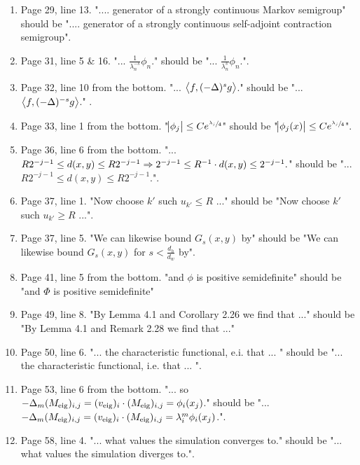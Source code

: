 \begin{enumerate}
	\item Page 29, line 13. ".... generator of a strongly continuous Markov semigroup" should be ".... generator of a strongly continuous self-adjoint contraction semigroup".
	\item Page 31, line 5 \& 16. "... $\frac{1}{\lambda_n^{-s}}\phi_n$." should be "... $\frac{1}{\lambda_n^{s}}\phi_n$.".
	\item Page 32, line 10 from the bottom. "... $\left\langle f, (-\Delta)^{s}g \right\rangle$." should be "... $\left\langle f, (-\Delta)^{-s}g \right\rangle$." .
	\item Page 33, line 1 from the bottom. "$\abs{\phi_j} \leq C e^{\sfrac{\lambda_j}{4}}$" should be "$\abs{\phi_j(x)} \leq C e^{\sfrac{\lambda_j}{4}}$".
	\item Page 36, line 6 from the bottom. "... $R2^{-j-1} \leq d(x,y) \leq R2^{-j-1} \Rightarrow 2^{-j-1} \leq R^{-1} \cdot d(x,y) \leq 2^{-j-1} .$" should be "... $R2^{-j-1} \leq d(x,y) \leq R2^{-j-1}.$".
	\item Page 37, line 1. "Now choose $k'$ such $u_{k'} \leq R$ ..." should be "Now choose $k'$ such $u_{k'} \geq R$ ...".
	\item Page 37, line 5. "We can likewise bound $G_s(x,y)$ by" should be "We can likewise bound $G_s(x,y)$ for $s < \frac{d_h}{d_w}$ by".
	\item Page 41, line 5 from the bottom. "and $\phi$ is positive semidefinite" should be "and $\Phi$ is positive semidefinite" 
	\item Page 49, line 8. "By Lemma 4.1 and Corollary 2.26 we find that ..." should be "By Lemma 4.1 and Remark 2.28 we find that ..."
	\item Page 50, line 6. "... the characteristic functional, e.i. that ... " should be "... the characteristic functional, i.e. that ... ".
	\item Page 53, line 6 from the bottom. "... so $-\Delta_m (M_{\text{eig}})_{i, j} = (v_{\text{eig}})_i \cdot(M_{\text{eig}})_{i, j} = \phi_i(x_j)$." should be "... $-\Delta_m (M_{\text{eig}})_{i, j} = (v_{\text{eig}})_i \cdot(M_{\text{eig}})_{i, j} = \lambda_i^{m} \phi_i(x_j)$.".
	\item Page 58, line 4. "... what values the simulation converges to." should be "... what values the simulation diverges to.".
\end{enumerate}